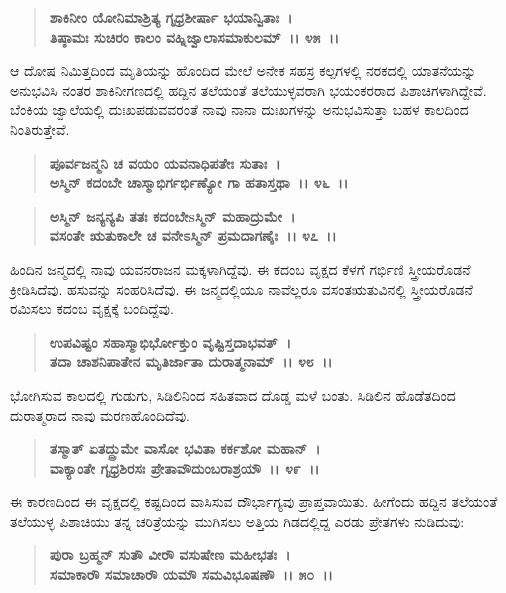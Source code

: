 \begin{verse}
\textbf{ಶಾಕಿನೀಂ ಯೋನಿಮಾಶ್ರಿತ್ಯ ಗೃಧ್ರಶೀರ್ಷಾ ಭಯಾನ್ವಿತಾಃ~।}\\\textbf{ತಿಷ್ಠಾಮಃ ಸುಚಿರಂ ಕಾಲಂ ವಹ್ನಿಜ್ವಾಲಾಸಮಾಕುಲಮ್~।। ೪೫~।। }
\end{verse}

ಆ ದೋಷ ನಿಮಿತ್ತದಿಂದ ಮೃತಿಯನ್ನು ಹೊಂದಿದ ಮೇಲೆ ಅನೇಕ ಸಹಸ್ರ ಕಲ್ಪಗಳಲ್ಲಿ ನರಕದಲ್ಲಿ ಯಾತನೆಯನ್ನು ಅನುಭವಿಸಿ ನಂತರ ಶಾಕಿನೀಗಣದಲ್ಲಿ ಹದ್ದಿನ ತಲೆಯಂತೆ ತಲೆಯುಳ್ಳವರಾಗಿ ಭಯಂಕರರಾದ ಪಿಶಾಚಿಗಳಾಗಿದ್ದೇವೆ. ಬೆಂಕಿಯ ಜ್ವಾಲೆಯಲ್ಲಿ ದುಃಖಪಡುವವರಂತೆ ನಾವು ನಾನಾ ದುಃಖಗಳನ್ನು ಅನುಭವಿಸುತ್ತಾ ಬಹಳ ಕಾಲದಿಂದ ನಿಂತಿರುತ್ತೇವೆ.

\begin{verse}
\textbf{ಪೂರ್ವಜನ್ಮನಿ ಚ ವಯಂ ಯವನಾಧಿಪತೇಃ ಸುತಾಃ~।}\\\textbf{ಅಸ್ಮಿನ್ ಕದಂಬೇ ಚಾಸ್ಮಾಭಿರ್ಗರ್ಭಿಣ್ಯೋ ಗಾ ಹತಾಸ್ತಥಾ~।। ೪೬~।। }
\end{verse}

\begin{verse}
\textbf{ಅಸ್ಮಿನ್ ಜನ್ಯನ್ಯಪಿ ತತಃ ಕದಂಬೇsಸ್ಮಿನ್ ಮಹಾದ್ರುಮೇ~।}\\\textbf{ವಸಂತೇ ಋತುಕಾಲೇ ಚ ವನೇಽಸ್ಮಿನ್ ಪ್ರಮದಾಗಣೈಃ~।। ೪೭~।।} 
\end{verse}

ಹಿಂದಿನ ಜನ್ಮದಲ್ಲಿ ನಾವು ಯವನರಾಜನ ಮಕ್ಕಳಾಗಿದ್ದೆವು. ಈ ಕದಂಬ ವೃಕ್ಷದ ಕೆಳಗೆ ಗರ್ಭಿಣಿ ಸ್ತ್ರೀಯರೊಡನೆ ಕ್ರೀಡಿಸಿದೆವು. ಹಸುವನ್ನು ಸಂಹರಿಸಿದೆವು. ಈ ಜನ್ಮದಲ್ಲಿಯೂ ನಾವೆಲ್ಲರೂ ವಸಂತಋತುವಿನಲ್ಲಿ ಸ್ತ್ರೀಯರೊಡನೆ ರಮಿಸಲು ಕದಂಬ ವೃಕ್ಷಕ್ಕೆ ಬಂದಿದ್ದೆವು.

\begin{verse}
\textbf{ಉಪವಿಷ್ಟಂ ಸಹಾಸ್ಮಾಭಿರ್ಭೋಕ್ತುಂ ವೃಷ್ಟಿಸ್ತದಾಭವತ್~।}\\\textbf{ತದಾ ಚಾಶನಿಪಾತೇನ ಮೃತಿರ್ಜಾತಾ ದುರಾತ್ಮನಾಮ್~।। ೪೮~।।} 
\end{verse}

ಭೋಗಿಸುವ ಕಾಲದಲ್ಲಿ ಗುಡುಗು, ಸಿಡಿಲಿನಿಂದ ಸಹಿತವಾದ ದೊಡ್ಡ ಮಳೆ ಬಂತು. ಸಿಡಿಲಿನ ಹೊಡೆತದಿಂದ ದುರಾತ್ಮರಾದ ನಾವು ಮರಣಹೊಂದಿದೆವು.

\begin{verse}
\textbf{ತಸ್ಮಾತ್ ಏತದ್ದ್ರುಮೇ ವಾಸೋ ಭವಿತಾ ಕರ್ಕಶೋ ಮಹಾನ್~।}\\\textbf{ವಾಕ್ಯಾಂತೇ ಗೃಧ್ರಶಿರಸಃ ಪ್ರೇತಾವೌದುಂಬರಾಶ್ರಯೌ~।। ೪೯~।।} 
\end{verse}

ಈ ಕಾರಣದಿಂದ ಈ ವೃಕ್ಷದಲ್ಲಿ ಕಷ್ಟದಿಂದ ವಾಸಿಸುವ ದೌರ್ಭಾಗ್ಯವು ಪ್ರಾಪ್ತವಾಯಿತು. ಹೀಗೆಂದು ಹದ್ದಿನ ತಲೆಯಂತೆ ತಲೆಯುಳ್ಳ ಪಿಶಾಚಿಯು ತನ್ನ ಚರಿತ್ರೆಯನ್ನು ಮುಗಿಸಲು ಅತ್ತಿಯ ಗಿಡದಲ್ಲಿದ್ದ ಎರಡು ಪ್ರೇತಗಳು ನುಡಿದುವು:

\begin{verse}
\textbf{ಪುರಾ ಬ್ರಹ್ಮನ್ ಸುತೌ ವೀರೌ ವಸುಷೇಣ ಮಹೀಭತಃ~।}\\\textbf{ಸಮಾಕಾರೌ ಸಮಾಚಾರೌ ಯಮೌ ಸಮವಿಭೂಷಣೌ~।। ೫೦~।।} 
\end{verse}

